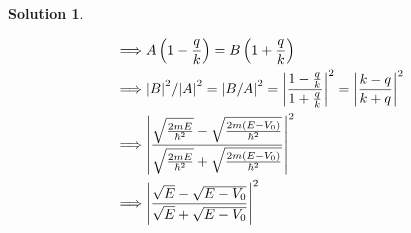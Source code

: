 \documentclass[10pt]{article}
\theoremstyle{definition}
\newtheorem{soln}{Solution}
\begin{document}
\begin{soln}
\begin{enumerate}[label=(\alph*)]
\begin{align*}
            \implies & A\left(1-\frac{q}{k}\right)=B\left(1+\frac{q}{k}\right)                                                                                 \\
            \implies & \abs{B}^2/\abs{A}^2=\abs{B/A}^2=\abs{\frac{1-\frac{q}{k}}{1+\frac{q}{k}}}^2=\abs{\frac{k-q}{k+q}}^2                                     \\
            \implies & \abs{\frac{\sqrt{\frac{2mE}{\hbar^2}}-\sqrt{\frac{2m(E-V_0)}{\hbar^2}}}{\sqrt{\frac{2mE}{\hbar^2}}+\sqrt{\frac{2m(E-V_0)}{\hbar^2}}}}^2 \\
            \implies & \abs{\frac{\sqrt{E}-\sqrt{E-V_0}}{\sqrt{E}+\sqrt{E-V_0}}}^2
          \end{align*}
  \end{enumerate}
\end{soln}
\end{document}
